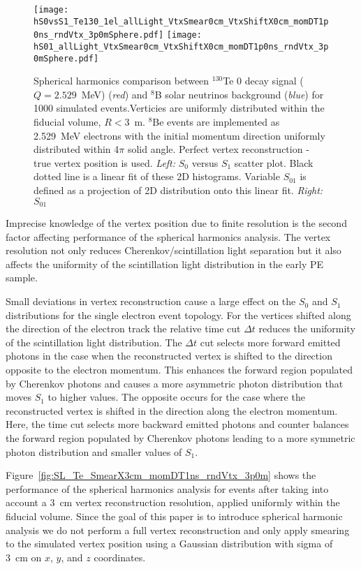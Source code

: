 \begin{figure*}[h]
  \centering
  \texttt{[image: hS0vsS1\_Te130\_1el\_allLight\_VtxSmear0cm\_VtxShiftX0cm\_momDT1p0ns\_rndVtx\_3p0mSphere.pdf]}
  \texttt{[image: hS01\_allLight\_VtxSmear0cm\_VtxShiftX0cm\_momDT1p0ns\_rndVtx\_3p0mSphere.pdf]}
  \caption{Spherical harmonics comparison between $^{130}$Te 0{\nbb}
    decay signal ($Q=2.529$~MeV) (\emph{red}) and $^{8}$B solar
    neutrinos background (\emph{blue}) for 1000 simulated
    events.Verticies are uniformly distributed within the fiducial
    volume, $R<3$~m. $^8$Be events are implemented as 2.529~MeV
    electrons with the initial momentum direction uniformly
    distributed within 4$\pi$ solid angle. Perfect vertex
    reconstruction - true vertex position is used. \emph{Left:} $S_0$
    versus $S_1$ scatter plot. Black dotted line is a linear fit of
    these 2D histograms. Variable $S_{01}$ is defined as a projection
    of 2D distribution onto this linear fit. \emph{Right:} $S_{01}$}
  \label{fig:SL_Te_SmearX0cm_momDT1ns_rndVtx_3p0m}
\end{figure*}


Imprecise knowledge of the vertex position due to finite resolution is
the second factor affecting performance of the spherical harmonics
analysis. The vertex resolution not only reduces Cherenkov/scintillation light separation but it also affects the uniformity of the scintillation light distribution in the early PE sample.

Small deviations in vertex reconstruction cause a large effect
on the $S_0$ and $S_1$ distributions for the single electron event topology.
For the vertices shifted along the direction of the electron track the relative time cut $\Delta t$
reduces the uniformity of the scintillation light distribution. The
$\Delta t$ cut selects more forward emitted photons in the case when
the reconstructed vertex is shifted to the direction opposite to the
electron momentum. This enhances the forward region populated by Cherenkov
photons and causes a more asymmetric photon distribution that moves $S_1$ to higher values.  The opposite occurs for the case where the reconstructed vertex is shifted in the direction along the electron
momentum. Here, the time cut selects more backward emitted photons and counter balances the forward region populated by Cherenkov
photons leading to a more symmetric photon distribution and smaller values of $S_1$.

Figure~\ref{fig:SL_Te_SmearX3cm_momDT1ns_rndVtx_3p0m} shows the performance of the spherical harmonics analysis for events after taking into account a 3~cm vertex reconstruction resolution, applied uniformly within the fiducial volume. Since the goal of this paper is to introduce spherical harmonic analysis we do not perform a full vertex reconstruction and only apply smearing to the simulated vertex position using a Gaussian distribution with sigma of 3~cm on $x$, $y$, and $z$ coordinates. 

